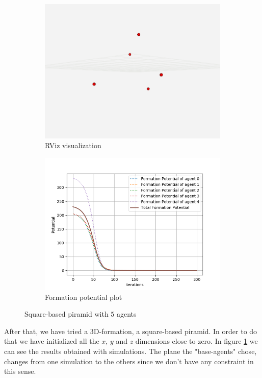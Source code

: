 \documentclass[a4paper,11pt,oneside]{book}
\begin{document}
\begin{figure}
\centering
	\begin{subfigure}{0.49\textwidth}	
	\includegraphics[scale=0.24]{piramid_rviz}
	\caption{RViz visualization}
	\end{subfigure}
\hfill
	\begin{subfigure}{0.49\textwidth}	
	\includegraphics[scale=0.42]{Formation_potential_piramid}
	\caption{Formation potential plot}
	\end{subfigure}
\caption{Square-based piramid with $5$ agents}
\label{Piramid}
\end{figure}

After that, we have tried a 3D-formation, a square-based piramid. In order to do that we have initialized all the $x$, $y$ and $z$ dimensions close to zero. In figure \ref{Piramid} we can see the results obtained with simulations. The plane the "base-agents" chose, changes from one simulation to the others since we don't have any constraint in this sense.
\end{document}
